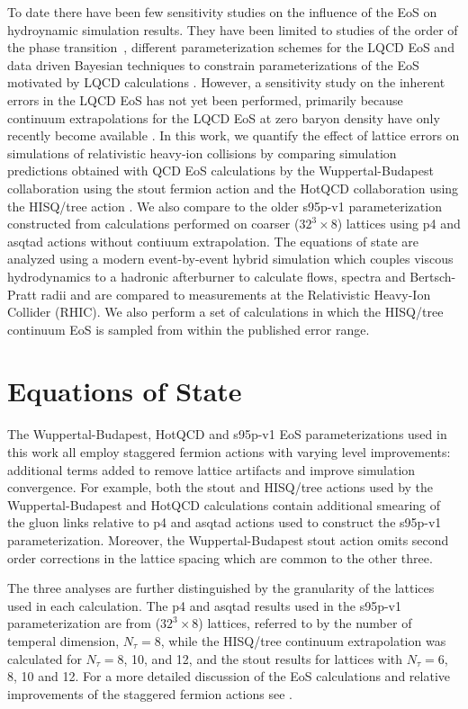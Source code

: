 \documentclass[aps,prc,reprint,amsmath,nofootinbib,superscriptaddress]{revtex4-1}
\begin{document}
To date there have been few sensitivity studies on the influence of the EoS on hydroynamic simulation results. 
They have been limited to studies of the order of the phase transition~\cite{Huovinen:2005gy}, different parameterization schemes for the LQCD EoS \cite{Huovinen:2009yb} and data driven Bayesian techniques to constrain parameterizations of the EoS motivated by LQCD calculations \cite{Pratt:2015zsa}.
However, a sensitivity study on the inherent errors in the LQCD EoS has not yet been performed, primarily because continuum extrapolations for the LQCD EoS at zero baryon density have only recently become available \cite{Borsanyi:2013bia,Bazavov:2014pvz}. 
In this work, we quantify the effect of lattice errors on simulations of relativistic heavy-ion collisions by comparing simulation predictions obtained with QCD EoS calculations by the Wuppertal-Budapest collaboration using the stout fermion action \cite{Borsanyi:2013bia} and the HotQCD collaboration using the HISQ/tree action \cite{Bazavov:2014pvz}.  
We also compare to the older s95p-v1 parameterization \cite{Huovinen:2009yb} constructed from calculations performed on coarser ($32^3 \times 8$) lattices using p4 and asqtad actions without contiuum extrapolation.  
The equations of state are analyzed using a modern event-by-event hybrid simulation which couples viscous hydrodynamics to a hadronic afterburner to calculate flows, spectra and Bertsch-Pratt radii and are compared to measurements at the Relativistic Heavy-Ion Collider (RHIC).
We also perform a set of calculations in which the HISQ/tree continuum EoS is sampled from within the published error range.


\section{Equations of State}
\label{eos}

The Wuppertal-Budapest, HotQCD and s95p-v1 EoS parameterizations used in this work all employ staggered fermion actions with varying level improvements: additional terms added to remove lattice artifacts and improve simulation convergence. 
For example, both the stout and HISQ/tree actions used by the Wuppertal-Budapest and HotQCD calculations contain additional smearing of the gluon links relative to p4 and asqtad actions used to construct the s95p-v1 parameterization.
Moreover, the Wuppertal-Budapest stout action omits second order corrections in the lattice spacing which are common to the other three. 

The three analyses are further distinguished by the granularity of the lattices used in each calculation.
The p4 and asqtad results used in the s95p-v1 parameterization are from ($32^3 \times 8$) lattices, referred to by the number of temperal dimension, $N_{\tau}=8$, while the HISQ/tree continuum extrapolation was calculated for $N_{\tau}=8$, 10, and 12, and the stout results for lattices with $N_{\tau}=6$, 8, 10 and 12. 
For a more detailed discussion of the EoS calculations and relative improvements of the staggered fermion actions see \cite{Soltz:2015ula}.
\end{document}
